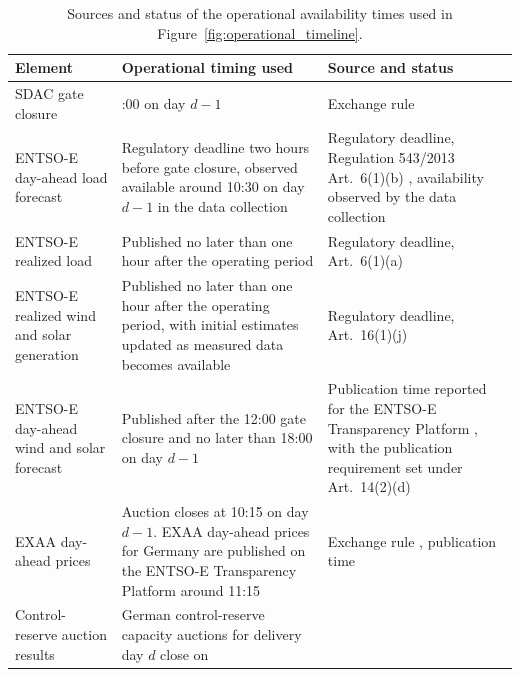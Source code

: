 \begin{table}[H]
  \centering
  \footnotesize
  \caption[Data sources and availability times of the operational inputs.]
  {Sources and status of the operational availability times used in
  Figure~\ref{fig:operational_timeline}.}
  \label{tab:data_timing}
  \begin{tabular}{@{}>{\raggedright\arraybackslash}p{}
                  >{\raggedright\arraybackslash}p{}
                  >{\raggedright\arraybackslash}p{}@{}}
    \toprule
    Element & Operational timing used & Source and status \\
    \midrule
    SDAC gate closure
    & 12:00 on day \(d-1\)
    & Exchange rule \cite{epexSpotPowerMarket} \\
    \addlinespace
    \mbox{ENTSO-E} day-ahead load forecast
    & Regulatory deadline two hours before gate closure, observed available
      around 10:30 on day \(d-1\) in the data collection
    & Regulatory deadline, Regulation 543/2013 Art.~6(1)(b)
      \cite{euRegulation543_2013}, availability observed by the data
      collection \\
    \addlinespace
    \mbox{ENTSO-E} realized load
    & Published no later than one hour after the operating period
    & Regulatory deadline, Art.~6(1)(a) \cite{euRegulation543_2013} \\
    \addlinespace
    \mbox{ENTSO-E} realized wind and solar generation
    & Published no later than one hour after the operating period, with
      initial estimates updated as measured data becomes available
    & Regulatory deadline, Art.~16(1)(j) \cite{euRegulation543_2013} \\
    \addlinespace
    \mbox{ENTSO-E} day-ahead wind and solar forecast
    & Published after the 12:00 gate closure and no later than
      18:00 on day \(d-1\)
    & Publication time reported for the \mbox{ENTSO-E} Transparency Platform
      \cite{kleinebrahm2026energyarena}, with the publication requirement set
      under Art.~14(2)(d) \cite{euRegulation543_2013} \\
    \addlinespace
    EXAA day-ahead prices
    & Auction closes at 10:15 on day \(d-1\). EXAA
      day-ahead prices for Germany are published on the \mbox{ENTSO-E} Transparency
      Platform around 11:15
    & Exchange rule \cite{exaaTradingRules2025}, publication time
      \cite{entsoeTransparency,eiser2026operational} \\
    \addlinespace
    Control-reserve auction results
    & German control-reserve capacity auctions for delivery day \(d\) close on

\end{tabular}
\end{table}
